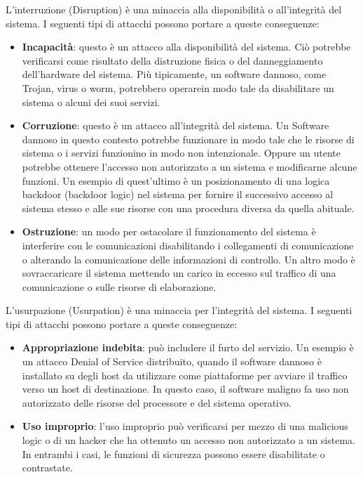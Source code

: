 L'interruzione (Disruption) è una minaccia alla disponibilità o all'integrità del sistema. I seguenti tipi di attacchi possono portare a queste conseguenze:
\begin{itemize}
    \item \textbf{Incapacità}: questo è un attacco alla disponibilità del sistema. Ciò potrebbe verificarsi come risultato della distruzione fisica o del danneggiamento dell'hardware del sistema. Più tipicamente, un software dannoso, come Trojan, virus o worm, potrebbero operarein modo tale da disabilitare un sistema o alcuni dei suoi servizi.
    \item \textbf{Corruzione}: questo è un attacco all'integrità del sistema. Un Software dannoso in questo contesto potrebbe funzionare in modo tale che le risorse di sistema o i servizi funzionino in modo non intenzionale. Oppure un utente potrebbe ottenere l'accesso non autorizzato a un sistema e modificarne alcune funzioni. Un esempio di quest'ultimo è un posizionamento di una logica backdoor (backdoor logic) nel sistema per fornire il successivo accesso al sistema stesso e alle sue risorse con una procedura diversa da quella abituale.
    \item \textbf{Ostruzione}: un modo per ostacolare il funzionamento del sistema è interferire con le comunicazioni disabilitando i collegamenti di comunicazione o alterando la comunicazione delle informazioni di controllo. Un altro modo è sovraccaricare il sistema mettendo un carico in eccesso sul traffico di una comunicazione o sulle risorse di elaborazione.
\end{itemize}

L'usurpazione (Usurpation) è una minaccia per l'integrità del sistema. I seguenti tipi di attacchi possono portare a queste conseguenze:
\begin{itemize}
    \item \textbf{Appropriazione indebita}: può includere il furto del servizio. Un esempio è un attacco Denial of Service distribuito, quando il software dannoso è installato su degli host da utilizzare come piattaforme per avviare il traffico verso un host di destinazione. In questo caso, il software maligno fa uso non autorizzato delle risorse del processore e del sistema operativo.
    \item \textbf{Uso improprio}: l'uso improprio può verificarsi per mezzo di una malicious logic o di un hacker che ha ottenuto un accesso non autorizzato a un sistema. In entrambi i casi, le funzioni di sicurezza possono essere disabilitate o contrastate.
\end{itemize}

